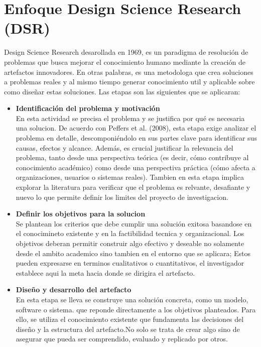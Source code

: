 \section{Enfoque Design Science Research (DSR)}
Design Science Research desarollada en 1969, es un paradigma de resolución de problemas que busca mejorar el 
conocimiento humano mediante la creación de artefactos innovadores. \cite{vomBrocke2020} En otras palabras, es una metodologa que crea soluciones a problemas  reales y al mismo tiempo generar
conocimiento util y aplicable sobre como diseñar estas soluciones. Las etapas son las siguientes que se aplicaran: 
\begin{itemize}[align=left, label=--]
    \item \textbf{Identificación del problema y motivación} \\
    En esta actividad se precisa el problema y se justifica por qué es necesaria una solucion. De acuerdo con Peffers et al. (2008), esta etapa exige analizar el problema en detalle, descomponiéndolo en sus partes clave para identificar sus causas, efectos y alcance. Además, es crucial justificar la relevancia del problema, tanto desde una perspectiva teórica (es decir, cómo contribuye al conocimiento académico) como desde una perspectiva práctica (cómo afecta a organizaciones, usuarios o sistemas reales). 
    Tambien en esta etapa implica explorar la literatura para verificar que el problema es relvante, desafiante y nuevo lo que 
    permite definir los limites del proyecto de investigacion.
    \item \textbf{Definir los objetivos para la solucion}\\
    Se plantean los criterios que debe cumplir una solución exitosa basandose en el conocimineto existente y en la factibilidad tecnica y organizacional.
    Los objetivos deberan permitir construir algo efectivo y deseable no solamente desde el ambito academico sino tambien en el entorno que se aplicara; Estos pueden expresarse en terminos cualitativos o cuantitativos, el investigador establece aqui la meta hacia donde se dirigira el artefacto.
    \item \textbf{Diseño y desarrollo del artefacto}\\
    En esta etapa se lleva se construye una solución concreta, como un modelo, software o sistema.
    que reponde directamente a los objetivos planteados. Para ello, se utiliza el conocimiento existente que fundamenta las decisiones del diseño y la estructura del artefacto.No solo se trata de crear algo sino de asegurar que pueda ser comprendido, evaluado y replicado por otros.

\end{itemize}
